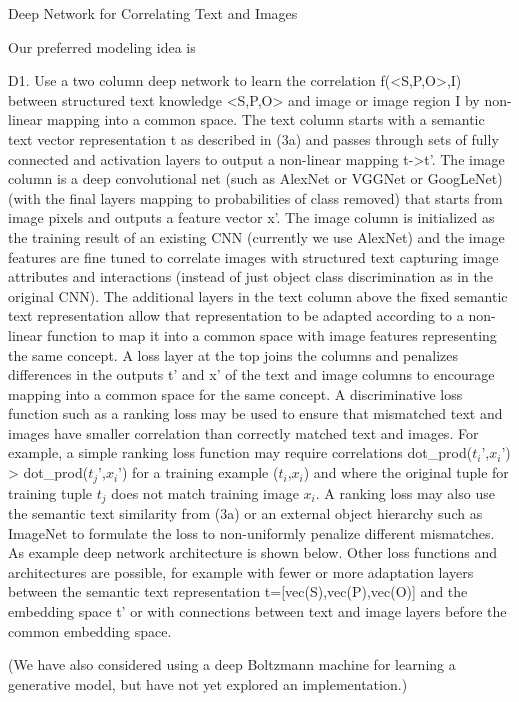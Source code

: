 \documentclass[runningheads]{llncs}
\begin{document}
Deep Network for Correlating Text and Images

Our preferred modeling idea is

D1. Use a two column deep network to learn the correlation f(<S,P,O>,I) between structured text knowledge <S,P,O> and image or image region I by non-linear mapping into a common space.
The text column starts with a semantic text vector representation t as described in (3a) and passes through sets of fully connected and activation layers to output a non-linear mapping t->t’. 
The image column is a deep convolutional net (such as AlexNet or VGGNet or GoogLeNet) (with the final layers mapping to probabilities of class removed) that starts from image pixels and outputs a feature vector x’. The image column is initialized as the training result of an existing CNN (currently we use AlexNet) and the image features are fine tuned to correlate images with structured text capturing image attributes and interactions (instead of just object class discrimination as in the original CNN). 
The additional layers in the text column above the fixed semantic text representation allow that representation to be adapted according to a non-linear function to map it into a common space with image features representing the same concept.
A loss layer at the top joins the columns and penalizes differences in the outputs t’ and x’ of the text and image columns to encourage mapping into a common space for the same concept. A discriminative loss function such as a ranking loss may be used to ensure that mismatched text and images have smaller correlation than correctly matched text and images. For example, a simple ranking loss function may require correlations dot\_prod($t_i’$,$x_i’$) > dot\_prod($t_j’$,$x_i’$) for a training example ($t_i$,$x_i$) and where the original tuple for training tuple $t_j$ does not match training image $x_i$. A ranking loss may also use the semantic text similarity from (3a) or an external object hierarchy such as ImageNet to formulate the loss to non-uniformly penalize different mismatches.
As example deep network architecture is shown below. Other loss functions and architectures are possible, for example with fewer or more adaptation layers between the semantic text representation t=[vec(S),vec(P),vec(O)] and the embedding space t’ or with connections between text and image layers before the common embedding space.




(We have also considered using a deep Boltzmann machine for learning a generative model, but have not yet explored an implementation.)
\end{document}
